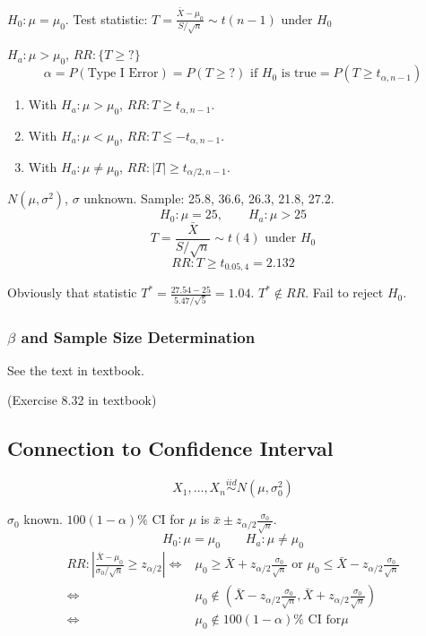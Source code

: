 $H_0:\mu=\mu_0$. Test statistic: $T=\frac{\bar{X}-\mu_0}{S/\sqrt{n}} \sim t(n-1) \text{ under } H_0$

$H_a: \mu>\mu_0$, $RR:\{T\geq ?\}$
\[\alpha=P(\text{Type I Error})=P(T\geq ?) \text{ if }H_0\text{ is true} =P(T\geq t_{\alpha,n-1}) \]

\begin{enumerate}
\item With $H_a: \mu>\mu_0$, $RR:T\geq t_{\alpha,n-1}$.
\item With $H_a: \mu<\mu_0$, $RR:T\leq -t_{\alpha,n-1}$.
\item With $H_a: \mu\neq\mu_0$, $RR:|T|\geq t_{\alpha/2,n-1}$.
\end{enumerate}

\begin{exmp}
$N(\mu,\sigma^2)$, $\sigma$ unknown. Sample: 25.8, 36.6, 26.3, 21.8, 27.2.
\[H_0:\mu=25, \qquad H_a:\mu>25 \]
\[T=\frac{\bar{X}}{S/\sqrt{n}} \sim t(4) \text{ under } H_0\]
\[RR:T\geq t_{0.05,4}=2.132\]

Obviously that statistic $T^*=\frac{27.54-25}{5.47/\sqrt{5}}=1.04$. $T^* \notin RR$. Fail to reject $H_0$.
\end{exmp}

\subsubsection{$\beta$ and Sample Size Determination}
See the text in textbook.

\noindent{}

\begin{exmp}
(Exercise 8.32 in textbook)
\end{exmp}

\subsection{Connection to Confidence Interval}
\[X_1,\dots,X_n \overset{iid}{\sim} N(\mu,\sigma_0^2)\]

$\sigma_0$ known. $100(1-\alpha)\%$ CI for $\mu$ is $\bar{x} \pm  z_{\alpha/2} \frac{\sigma_0}{\sqrt{n}} $.
\[H_0:\mu=\mu_0 \qquad H_a:\mu\neq\mu_0\]
\begin{align*}
RR:\left| \frac{\bar{X}-\mu_0}{\sigma_0/\sqrt{n}}\geq z_{\alpha/2} \right| \Leftrightarrow & \mu_0\geq \bar{X}+ z_{\alpha/2} \frac{\sigma_0}{\sqrt{n}} \text{ or } \mu_0\leq \bar{X}- z_{\alpha/2} \frac{\sigma_0}{\sqrt{n}} \\
\Leftrightarrow & \mu_0 \notin \left(\bar{X}-  z_{\alpha/2} \frac{\sigma_0}{\sqrt{n}},\bar{X}+ z_{\alpha/2} \frac{\sigma_0}{\sqrt{n}}\right) \\
\Leftrightarrow & \mu_0 \notin 100(1-\alpha)\% \text{ CI for} \mu
\end{align*}

